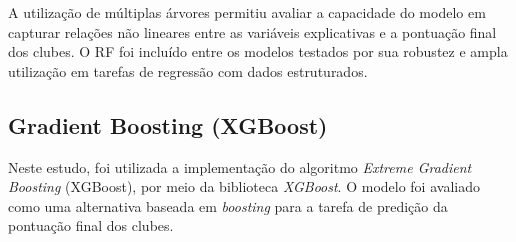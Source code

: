 A utilização de múltiplas árvores permitiu avaliar a capacidade do modelo em capturar relações não lineares entre as variáveis explicativas e a pontuação final dos clubes. 
O RF foi incluído entre os modelos testados por sua robustez e ampla utilização em tarefas de regressão com dados estruturados.

\subsection{Gradient Boosting (XGBoost)}

Neste estudo, foi utilizada a implementação do algoritmo \textit{Extreme Gradient Boosting} (XGBoost), por meio da biblioteca \textit{XGBoost}. 
O modelo foi avaliado como uma alternativa baseada em \textit{boosting} para a tarefa de predição da pontuação final dos clubes.

